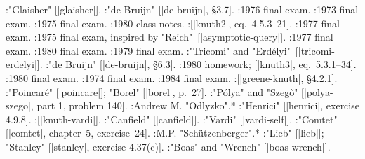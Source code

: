 :"Glaisher" [|glaisher|].
:"de Bruijn" [|de-bruijn|, \S 3.7].
:1976 final exam.
:1973 final exam.
:1975 final exam.
:1980 class notes.
:[|knuth2|, eq.~4.5.3--21].
:1977 final exam.
:1975 final exam, inspired by "Reich"~[|asymptotic-query|].
:1977 final exam.
:1980 final exam.
:1979 final exam.
:"Tricomi" and "Erd\'elyi"~[|tricomi-erdelyi|].
:"de Bruijn" [|de-bruijn|, \S 6.3].
:1980 homework; [|knuth3|, eq.~5.3.1--34].
:1980 final exam.
:1974 final exam.
:1984 final exam.
:[|greene-knuth|, \S 4.2.1].
:"Poincar\'e" [|poincare|]; "Borel" [|borel|, p.~27].
:"P\'olya" and "Szeg\H o" [|polya-szego|, part 1, problem 140].
:Andrew M. "Odlyzko".*
:"Henrici" [|henrici|, exercise 4.9.8].
:[|knuth-vardi|].
:"Canfield" [|canfield|].
:"Vardi" [|vardi-self|].
:"Comtet" [|comtet|, chapter~5, exercise~24].
:M.\thinspace P. "Sch\"utzenberger".*
:"Lieb" [|lieb|]; "Stanley" [|stanley|, exercise 4.37(c)].
:"Boas" and "Wrench" [|boas-wrench|].

